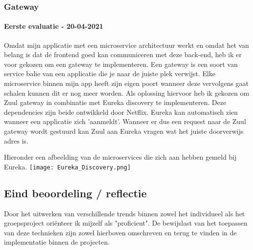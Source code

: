 \subsubsection{Gateway}\label{subsec:gateway}
\paragraph{Eerste evaluatie - 20-04-2021}
Omdat mijn applicatie met een microservice architectuur werkt en omdat het van belang is dat de frontend goed kan communiceren met deze back-end, heb ik er voor gekozen om een gateway te implementeren.
Een gateway is een soort van service balie van een applicatie die je naar de juiste plek verwijst.
Elke microservice binnen mijn app heeft zijn eigen poort wanneer deze vervolgens gaat schalen kunnen dit er nog meer worden.
Als oplossing hiervoor heb ik gekozen om Zuul gateway in combinatie met Eureka discovery te implementeren.
Deze dependencies zijn beide ontwikkeld door Netflix.
Eureka kan automatisch zien wanneer een applicatie zich 'aanmeldt'. Wanneer er dus een request naar de Zuul gateway
wordt gestuurd kan Zuul aan Eureka vragen wat het juiste doorverwijs adres is.

Hieronder een afbeelding van de microservices die zich aan hebben gemeld bij Eureka.
\texttt{[image: Eureka\_Discovery.png]}\label{fig:eureka_discovery}


\subsection{Eind beoordeling / reflectie}
Door het uitwerken van verschillende trends binnen zowel het individueel als het groepsproject oriënteer ik mijzelf
als "proficient". De bewijslast van het toepassen van deze technieken zijn zowel hierboven omschreven en terug te
vinden in de implementatie binnen de projecten.

\newpage
